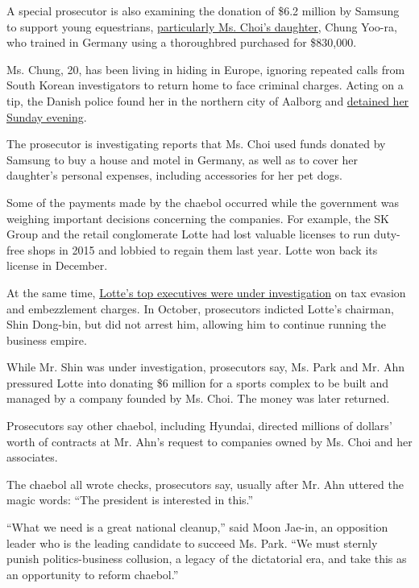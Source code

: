 A special prosecutor is also examining the donation of \$6.2 million by
Samsung to support young equestrians,
\href{http://www.reuters.com/article/us-southkorea-politics-samsung-equestria-idUSKBN14J0T0}{particularly
Ms. Choi's daughter}, Chung Yoo-ra, who trained in Germany using a
thoroughbred purchased for \$830,000.

Ms. Chung, 20, has been living in hiding in Europe, ignoring repeated
calls from South Korean investigators to return home to face criminal
charges. Acting on a tip, the Danish police found her in the northern
city of Aalborg and
\href{https://www.nytimes.com/2017/01/02/world/asia/south-korea-scandal-choi-soon-sil-daughter.html}{detained
her Sunday evening}.

The prosecutor is investigating reports that Ms. Choi used funds donated
by Samsung to buy a house and motel in Germany, as well as to cover her
daughter's personal expenses, including accessories for her pet dogs.

Some of the payments made by the chaebol occurred while the government
was weighing important decisions concerning the companies. For example,
the SK Group and the retail conglomerate Lotte had lost valuable
licenses to run duty-free shops in 2015 and lobbied to regain them last
year. Lotte won back its license in December.

At the same time,
\href{https://www.nytimes.com/2016/10/20/business/international/south-korea-lotte-chaebol-conglomerate-indicted.html}{Lotte's
top executives were under investigation} on tax evasion and embezzlement
charges. In October, prosecutors indicted Lotte's chairman, Shin
Dong-bin, but did not arrest him, allowing him to continue running the
business empire.

While Mr. Shin was under investigation, prosecutors say, Ms. Park and
Mr. Ahn pressured Lotte into donating \$6 million for a sports complex
to be built and managed by a company founded by Ms. Choi. The money was
later returned.

Prosecutors say other chaebol, including Hyundai, directed millions of
dollars' worth of contracts at Mr. Ahn's request to companies owned by
Ms. Choi and her associates.

The chaebol all wrote checks, prosecutors say, usually after Mr. Ahn
uttered the magic words: ``The president is interested in this.''

``What we need is a great national cleanup,'' said Moon Jae-in, an
opposition leader who is the leading candidate to succeed Ms. Park. ``We
must sternly punish politics-business collusion, a legacy of the
dictatorial era, and take this as an opportunity to reform chaebol.''


